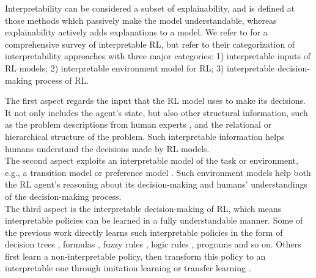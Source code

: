 \documentclass[twoside,11pt]{article}
\begin{document}
Interpretability can be considered a subset of explainability, and is defined at those methods which passively make the model understandable, whereas explainability actively adds explanations to a model. We refer to \cite{GlanoisEtAl:2021:SurveyInterpretableRL} for a comprehensive survey of interpretable RL, but refer to their categorization of interpretability approaches with three major categories: 1) interpretable inputs of RL models; 2) interpretable environment model for RL; 3) interpretable decision-making process of RL. %

The first aspect regards the input that the RL model uses to make its decisions. It not only includes the agent's state, but also other structural information, such as the problem descriptions from human experts \citep{hasanbeig2021deepsynth}, and the relational \citep{martinez2017relational,battaglia2018relational} or hierarchical structure \citep{andreas2017modular,lyu2019sdrl} of the problem. Such interpretable information helps humans understand the decisions made by RL models.\\

The second aspect exploits an interpretable model of the task or environment, e.g., a transition model \citep{martinez2016learning,zhu2020object} or preference model \citep{toro2019learning,icarte2018using}. Such environment models help both the RL agent's reasoning about its decision-making and humans' understandings of the decision-making process.\\

The third aspect is the interpretable decision-making of RL, which means interpretable policies can be learned in a fully understandable manner. Some of the previous work directly learns such interpretable policies in the form of decision trees \citep{likmeta2020combining,silva2020optimization,topin2021iterative}, formulas \citep{hein2018interpretable,hein2019generating}, fuzzy rules \citep{zhang2021kogun,akrour2019towards,hein2017particle}, logic rules \citep{jiang2019neural}, programs \citep{verma2019imitation,sun2019program} and so on. Others first learn a non-interpretable policy, then transform this policy to an interpretable one through imitation learning or transfer learning \citep{VermaEtAl:2018:ProgrammaticallyInterpretableRL,bastani2018verifiable}.\\

\end{document}
